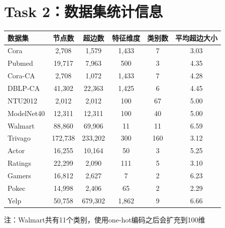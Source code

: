 
\section*{Task 2：数据集统计信息}
\par
\begin{table}[htbp]
    \centering
    \renewcommand{\arraystretch}{1.2} 
    \begin{tabular}{lccccc}
        \toprule
        数据集 & 节点数 & 超边数 & 特征维度 & 类别数 & 平均超边大小 \\
        \midrule
        
        Cora & 2,708 & 1,579 & 1,433 & 7 & 3.03 \\
        Pubmed & 19,717 & 7,963 & 500 & 3 & 4.35 \\
        Cora-CA & 2,708 & 1,072 & 1,433 & 7 & 4.28 \\
        DBLP-CA & 41,302 & 22,363 & 1,425 & 6 & 4.45 \\
        NTU2012 & 2,012 & 2,012 & 100 & 67 & 5.00 \\
        ModelNet40 & 12,311 & 12,311 & 100 & 40 & 5.00 \\
        Walmart & 88,860 & 69,906 & 11 & 11 & 6.59 \\
        Trivago & 172,738 & 233,202 & 300 & 160 & 3.12 \\
        
        \midrule
        
        Actor & 16,255 & 10,164 & 50 & 3 & 5.25 \\
        Ratings & 22,299 & 2,090 & 111 & 5 & 3.10 \\
        Gamers & 16,812 & 2,627 & 7 & 2 & 6.23 \\
        Pokec & 14,998 & 2,406 & 65 & 2 & 2.29 \\
        Yelp & 50,758 & 679,302 & 1,862 & 9 & 6.66 \\
        
        \bottomrule
    \end{tabular}
    
    \vspace{0.8em} 
    \par\noindent 注：Walmart共有11个类别，使用one-hot编码之后会扩充到100维
\end{table}
\par
